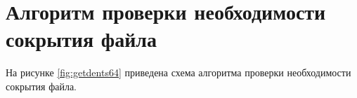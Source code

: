 







\section{Алгоритм проверки необходимости сокрытия файла}

На рисунке \ref{fig:getdents64} приведена схема алгоритма проверки необходимости сокрытия файла.

